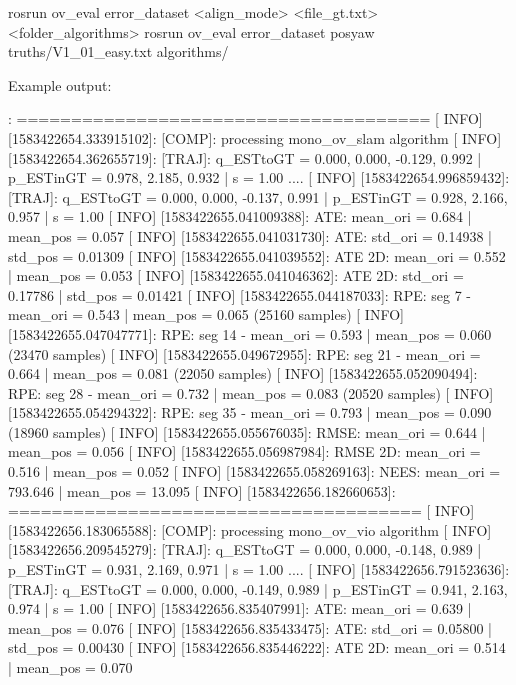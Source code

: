 \begin{DoxyCode}
rosrun ov\_eval error\_dataset <align\_mode> <file\_gt.txt> <folder\_algorithms>
rosrun ov\_eval error\_dataset posyaw truths/V1\_01\_easy.txt algorithms/
\end{DoxyCode}


Example output\+:


\begin{DoxyCode}
[ INFO] [1583422654.333642977]: ======================================
[ INFO] [1583422654.333915102]: [COMP]: processing mono\_ov\_slam algorithm
[ INFO] [1583422654.362655719]: [TRAJ]: q\_ESTtoGT = 0.000, 0.000, -0.129, 0.992 | p\_ESTinGT = 0.978, 2.185,
       0.932 | s = 1.00
....
[ INFO] [1583422654.996859432]: [TRAJ]: q\_ESTtoGT = 0.000, 0.000, -0.137, 0.991 | p\_ESTinGT = 0.928, 2.166,
       0.957 | s = 1.00
[ INFO] [1583422655.041009388]:     ATE: mean\_ori = 0.684 | mean\_pos = 0.057
[ INFO] [1583422655.041031730]:     ATE: std\_ori  = 0.14938 | std\_pos  = 0.01309
[ INFO] [1583422655.041039552]:     ATE 2D: mean\_ori = 0.552 | mean\_pos = 0.053
[ INFO] [1583422655.041046362]:     ATE 2D: std\_ori  = 0.17786 | std\_pos  = 0.01421
[ INFO] [1583422655.044187033]:     RPE: seg 7 - mean\_ori = 0.543 | mean\_pos = 0.065 (25160 samples)
[ INFO] [1583422655.047047771]:     RPE: seg 14 - mean\_ori = 0.593 | mean\_pos = 0.060 (23470 samples)
[ INFO] [1583422655.049672955]:     RPE: seg 21 - mean\_ori = 0.664 | mean\_pos = 0.081 (22050 samples)
[ INFO] [1583422655.052090494]:     RPE: seg 28 - mean\_ori = 0.732 | mean\_pos = 0.083 (20520 samples)
[ INFO] [1583422655.054294322]:     RPE: seg 35 - mean\_ori = 0.793 | mean\_pos = 0.090 (18960 samples)
[ INFO] [1583422655.055676035]:     RMSE: mean\_ori = 0.644 | mean\_pos = 0.056
[ INFO] [1583422655.056987984]:     RMSE 2D: mean\_ori = 0.516 | mean\_pos = 0.052
[ INFO] [1583422655.058269163]:     NEES: mean\_ori = 793.646 | mean\_pos = 13.095
[ INFO] [1583422656.182660653]: ======================================
[ INFO] [1583422656.183065588]: [COMP]: processing mono\_ov\_vio algorithm
[ INFO] [1583422656.209545279]: [TRAJ]: q\_ESTtoGT = 0.000, 0.000, -0.148, 0.989 | p\_ESTinGT = 0.931, 2.169,
       0.971 | s = 1.00
....
[ INFO] [1583422656.791523636]: [TRAJ]: q\_ESTtoGT = 0.000, 0.000, -0.149, 0.989 | p\_ESTinGT = 0.941, 2.163,
       0.974 | s = 1.00
[ INFO] [1583422656.835407991]:     ATE: mean\_ori = 0.639 | mean\_pos = 0.076
[ INFO] [1583422656.835433475]:     ATE: std\_ori  = 0.05800 | std\_pos  = 0.00430
[ INFO] [1583422656.835446222]:     ATE 2D: mean\_ori = 0.514 | mean\_pos = 0.070

\end{DoxyCode}
